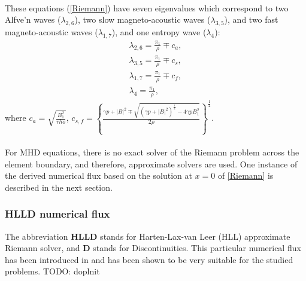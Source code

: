 \paragraph{}
These equations (\ref{Riemann}) have seven eigenvalues which correspond to two Alfve'n waves ($\lambda_{2, 6}$), two slow magneto-acoustic waves ($\lambda_{3, 5}$), and two fast magneto-acoustic waves ($\lambda_{1, 7}$), and one entropy wave ($\lambda_{4}$):
\begin{eqnarray}
\lambda_{2, 6} = \frac{\pi_1}{\rho} \mp c_a,\\
\lambda_{3, 5} = \frac{\pi_1}{\rho} \mp c_s,\\
\lambda_{1, 7} = \frac{\pi_1}{\rho} \mp c_f,\\
\lambda_{4} = \frac{\pi_1}{\rho},
\end{eqnarray}
where $c_a = \sqrt{\frac{B_1^2}{rho}}$, $c_{s, f} = \left\{\frac{\gamma p + |B|^2 \mp \sqrt{\left(\gamma p + |B|^2\right)^{\frac12} - 4\gamma p B_1^2}}{2\rho}\right\}^{\frac12}$.
\paragraph{}
For MHD equations, there is no exact solver of the Riemann problem across the element boundary, and therefore, approximate solvers are used. One instance of the derived numerical flux based on the solution at $x = 0$ of \ref{Riemann} is described in the next section.
	
\subsubsection{HLLD numerical flux}
The abbreviation \textbf{HLLD} stands for Harten-Lax-van Leer (HLL) approximate Riemann solver, and \textbf{D} stands for Discontinuities.
This particular numerical flux has been introduced in \citep{hlld} and has been shown to be very suitable for the studied problems.
TODO: doplnit
